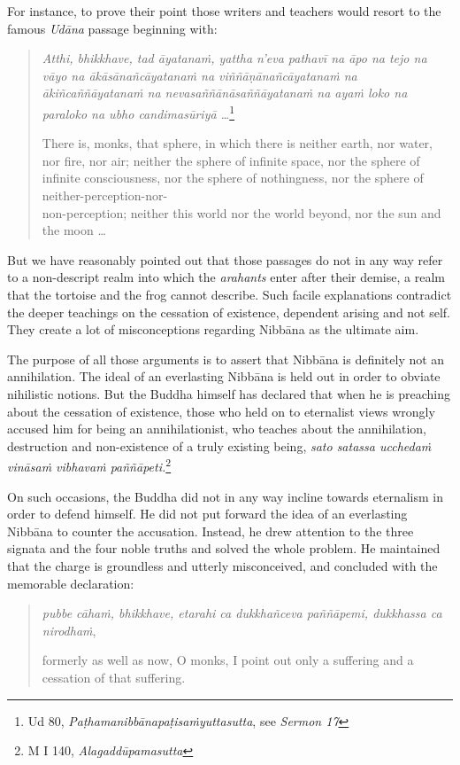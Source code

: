 For instance, to prove their point those writers and teachers would resort to the famous \emph{Udāna} passage beginning with:

\begin{quote}
\emph{Atthi, bhikkhave, tad āyatanaṁ, yattha n'eva pathavī na āpo na tejo na vāyo na ākāsānañcāyatanaṁ na viññāṇānañcāyatanaṁ na ākiñcaññāyatanaṁ na nevasaññānāsaññāyatanaṁ na ayaṁ loko na paraloko na ubho candimasūriyā \ldots{}}\footnote{Ud 80, \emph{Paṭhamanibbānapaṭisaṁyuttasutta}, see \emph{Sermon 17}}

There is, monks, that sphere, in which there is neither earth, nor water, nor fire, nor air; neither the sphere of infinite space, nor the sphere of infinite consciousness, nor the sphere of nothingness, nor the sphere of neither-perception-nor-\\ non-perception; neither this world nor the world beyond, nor the sun and the moon \ldots{}
\end{quote}

But we have reasonably pointed out that those passages do not in any way refer to a non-descript realm into which the \emph{arahants} enter after their demise, a realm that the tortoise and the frog cannot describe. Such facile explanations contradict the deeper teachings on the cessation of existence, dependent arising and not self. They create a lot of misconceptions regarding Nibbāna as the ultimate aim.

The purpose of all those arguments is to assert that Nibbāna is definitely not an annihilation. The ideal of an everlasting Nibbāna is held out in order to obviate nihilistic notions. But the Buddha himself has declared that when he is preaching about the cessation of existence, those who held on to eternalist views wrongly accused him for being an annihilationist, who teaches about the annihilation, destruction and non-existence of a truly existing being, \emph{sato satassa ucchedaṁ vināsaṁ vibhavaṁ paññāpeti.}\footnote{M I 140, \emph{Alagaddūpamasutta}}

On such occasions, the Buddha did not in any way incline towards eternalism in order to defend himself. He did not put forward the idea of an everlasting Nibbāna to counter the accusation. Instead, he drew attention to the three signata and the four noble truths and solved the whole problem. He maintained that the charge is groundless and utterly misconceived, and concluded with the memorable declaration:

\begin{quote}
\emph{pubbe cāhaṁ, bhikkhave, etarahi ca dukkhañceva paññāpemi, dukkhassa ca nirodhaṁ},

formerly as well as now, O monks, I point out only a suffering and a cessation of that suffering.
\end{quote}

